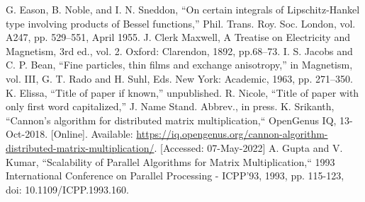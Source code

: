 \documentclass[conference]{IEEEtran}
\begin{document}
\begin{thebibliography}{00}
 G. Eason, B. Noble, and I. N. Sneddon, ``On certain integrals of Lipschitz-Hankel type involving products of Bessel functions,'' Phil. Trans. Roy. Soc. London, vol. A247, pp. 529--551, April 1955.
 J. Clerk Maxwell, A Treatise on Electricity and Magnetism, 3rd ed., vol. 2. Oxford: Clarendon, 1892, pp.68--73.
 I. S. Jacobs and C. P. Bean, ``Fine particles, thin films and exchange anisotropy,'' in Magnetism, vol. III, G. T. Rado and H. Suhl, Eds. New York: Academic, 1963, pp. 271--350.
 K. Elissa, ``Title of paper if known,'' unpublished.
 R. Nicole, ``Title of paper with only first word capitalized,'' J. Name Stand. Abbrev., in press.
 K. Srikanth, ``Cannon's algorithm for distributed matrix multiplication,`` OpenGenus IQ, 13-Oct-2018. [Online]. Available: \href{https://iq.opengenus.org/cannon-algorithm-distributed-matrix-multiplication/}{https://iq.opengenus.org/cannon-algorithm-distributed-matrix-multiplication/}. [Accessed: 07-May-2022] 
 A. Gupta and V. Kumar, ``Scalability of Parallel Algorithms for Matrix Multiplication,`` 1993 International Conference on Parallel Processing - ICPP'93, 1993, pp. 115-123, doi: 10.1109/ICPP.1993.160.
\end{thebibliography}
\end{document}
